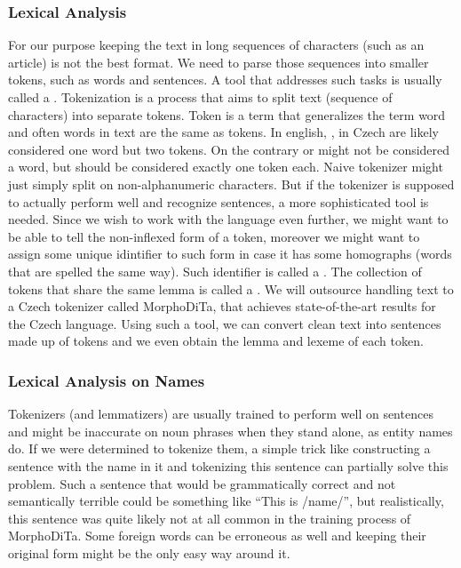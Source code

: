 \subsubsection{Lexical Analysis}
For our purpose keeping the text in long sequences of characters (such as an article) is not the best format. We need to parse those sequences into smaller tokens, such as words and sentences. A tool that addresses such tasks is usually called a .
Tokenization is a process that aims to split text (sequence of characters) into separate tokens. Token is a term that generalizes the term word and often words in text are the same as tokens. In english, , in Czech  are likely considered one word but two tokens. On the contrary  or  might not be considered a word, but should be considered exactly one token each. Naive tokenizer might just simply split on non-alphanumeric characters. But if the tokenizer is supposed to actually perform well and recognize sentences, a more sophisticated tool is needed. 
Since we wish to work with the language even further, we might want to be able to tell the non-inflexed form of a token, moreover we might want to assign some unique idintifier to such form in case it has some homographs (words that are spelled the same way). Such identifier is called a . The collection of tokens that share the same lemma is called a . 
We will outsource handling text to a Czech tokenizer called MorphoDiTa, that achieves state-of-the-art results for the Czech language. Using such a tool, we can convert clean text into sentences made up of tokens and we even obtain the lemma and lexeme of each token.

\subsubsection{Lexical Analysis on Names}
Tokenizers (and lemmatizers) are usually trained to perform well on sentences and might be inaccurate on noun phrases when they stand alone, as entity names do. If we were determined to tokenize them, a simple trick like constructing a sentence with the name in it and tokenizing this sentence can partially solve this problem. Such a sentence that would be grammatically correct and not semantically terrible could be something like “This is /name/”, but realistically, this sentence was quite likely not at all common in the training process of MorphoDiTa. Some foreign words can be erroneous as well and keeping their original form might be the only easy way around it.

